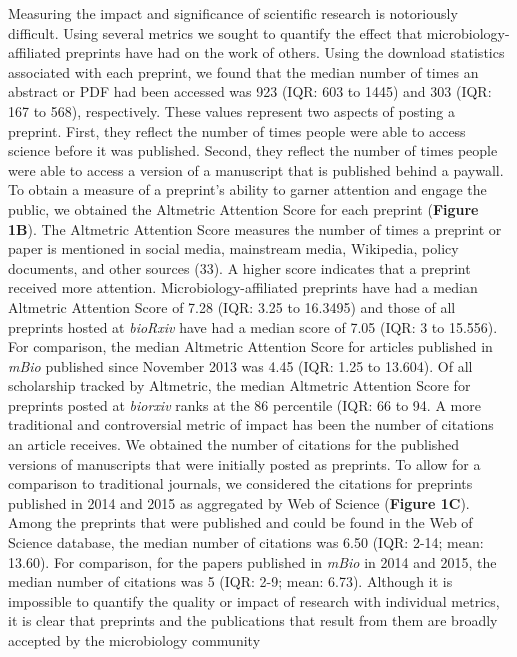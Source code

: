 \documentclass[11pt,]{article}
\begin{document}
Measuring the impact and significance of scientific research is
notoriously difficult. Using several metrics we sought to quantify the
effect that microbiology-affiliated preprints have had on the work of
others. Using the download statistics associated with each preprint, we
found that the median number of times an abstract or PDF had been
accessed was 923 (IQR: 603 to 1445) and 303 (IQR: 167 to 568),
respectively. These values represent two aspects of posting a preprint.
First, they reflect the number of times people were able to access
science before it was published. Second, they reflect the number of
times people were able to access a version of a manuscript that is
published behind a paywall. To obtain a measure of a preprint's ability
to garner attention and engage the public, we obtained the Altmetric
Attention Score for each preprint (\textbf{Figure 1B}). The Altmetric
Attention Score measures the number of times a preprint or paper is
mentioned in social media, mainstream media, Wikipedia, policy
documents, and other sources (33). A higher score indicates that a
preprint received more attention. Microbiology-affiliated preprints have
had a median Altmetric Attention Score of 7.28 (IQR: 3.25 to 16.3495)
and those of all preprints hosted at \emph{bioRxiv} have had a median
score of 7.05 (IQR: 3 to 15.556). For comparison, the median Altmetric
Attention Score for articles published in \emph{mBio} published since
November 2013 was 4.45 (IQR: 1.25 to 13.604). Of all scholarship tracked
by Altmetric, the median Altmetric Attention Score for preprints posted
at \emph{biorxiv} ranks at the 86 percentile (IQR: 66 to 94. A more
traditional and controversial metric of impact has been the number of
citations an article receives. We obtained the number of citations for
the published versions of manuscripts that were initially posted as
preprints. To allow for a comparison to traditional journals, we
considered the citations for preprints published in 2014 and 2015 as
aggregated by Web of Science (\textbf{Figure 1C}). Among the preprints
that were published and could be found in the Web of Science database,
the median number of citations was 6.50 (IQR: 2-14; mean: 13.60). For
comparison, for the papers published in \emph{mBio} in 2014 and 2015,
the median number of citations was 5 (IQR: 2-9; mean: 6.73). Although it
is impossible to quantify the quality or impact of research with
individual metrics, it is clear that preprints and the publications that
result from them are broadly accepted by the microbiology community
\end{document}

